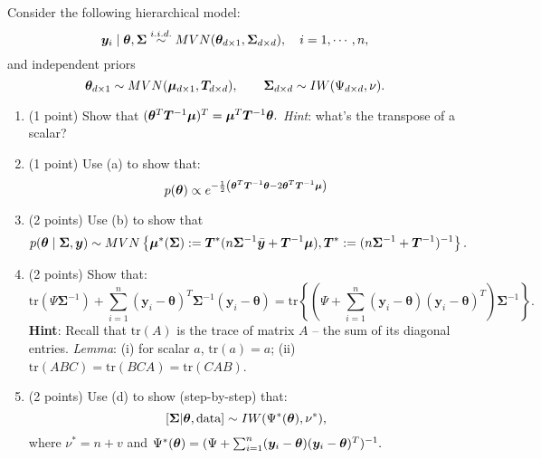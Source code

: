 \documentclass{article}
\newcommand{\bSigma}{\boldsymbol{\Sigma}}
\begin{document}
\begin{enumerate}
Consider the following hierarchical model:
\[ \bm{y}_i \mid \btheta,\bSigma \stackrel{i.i.d.}{\sim} MVN(\btheta_{d \times 1},\bSigma_{d \times d}), \quad i = 1, \cdots, n, \]
and independent priors $$\btheta_{d \times 1} \sim MVN(\bmu_{d \times 1},\bm{T}_{d \times d}), 
\qquad \bSigma_{d \times d} \sim IW(\Psi_{d \times d},\nu).$$
\begin{enumerate}
\item (1 point) Show that $({\bm\theta}^T \bm{T}^{-1} \bm{\mu})^T = \bm{\mu}^T \bm{T}^{-1} {\bm\theta}.$
\textit{Hint}: what's the transpose of a scalar?
\item (1 point) Use (a) to show that:
\[ p({\bm\theta}) \propto e^{-\frac{1}{2}\left({\bm\theta}^T\bm{T}^{-1}{\bm\theta} - 2{\bm\theta}^T \bm{T}^{-1} \bm{\mu} \right)} \]
\item (2 points) Use (b) to show that
$$ p(\btheta \mid \bSigma, \bm{y} )
\sim MVN\left\{\bmu^*(\bSigma) := {\bm{T}^*}(n \boldsymbol{\Sigma}^{-1}\bar{\bm{y}} + \bm{T}^{-1}\bmu), \bm{T}^* := ( n\boldsymbol{\Sigma}^{-1} + \bm{T}^{-1})^{-1}\right\}. $$
\item (2 points) Show that:
\[ \text{tr}(\Psi\boldsymbol{\Sigma}^{-1})+\sum_{i=1}^n (\bm{y}_i-\boldsymbol{\theta})^T \boldsymbol{\Sigma}^{-1}(\bm{y}_i-\boldsymbol{\theta}) = \text{tr}\left\{\left(\Psi + \sum_{i=1}^n (\bm{y}_i-\boldsymbol{\theta}) (\bm{y}_i-\boldsymbol{\theta})^T \right) \boldsymbol{\Sigma}^{-1}\right\}.\]
\textbf{Hint}: Recall that $\text{tr}(A)$ is the trace of matrix $A$ -- the sum of its diagonal entries. \textit{Lemma}: (i) for scalar $a$, $\text{tr}(a)=a$; (ii) $\text{tr}(ABC) = \text{tr}(BCA) = \text{tr}(CAB)$.
\item (2 points) Use (d) to show (step-by-step) that:
\[ [\bSigma|\btheta,\text{data}] \sim IW(\Psi^*(\btheta),\nu^*),\]
where $\nu^* = n + v$ and $\Psi^*({\bm\theta}) = (\Psi + \sum_{i=1}^n (\bm{y}_i-\boldsymbol{\theta}) (\bm{y}_i-\boldsymbol{\theta})^T)^{-1} .$
\end{enumerate}
\end{enumerate}
\end{document}
